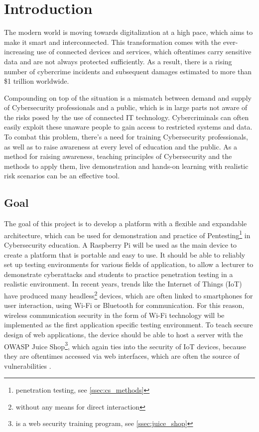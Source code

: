 \chapter{Introduction}\label{ch:intro}
The modern world is moving towards digitalization at a high pace, which aims to make it smart and interconnected. 
This transformation comes with the ever-increasing use of connected devices and services, which oftentimes carry sensitive data and are not always protected sufficiently.
As a result, there is a rising number of cybercrime incidents and subsequent damages estimated to more than \$1 trillion worldwide.

Compounding on top of the situation is a mismatch between demand and supply of Cybersecurity professionals and a public, which is in large parts not aware of the risks posed by the use of connected IT technology.
Cybercriminals can often easily exploit these unaware people to gain access to restricted systems and data.
To combat this problem, there's a need for training Cybersecurity professionals, as well as to raise awareness at every level of education and the public.
As a method for raising awareness, teaching principles of Cybersecurity and the methods to apply them, live demonstration and hands-on learning with realistic risk scenarios can be an effective tool. \cite{mariano2024wifi}\cite{Cybersec_Edu}


\section{Goal}
The goal of this project is to develop a platform with a flexible and expandable architecture, which can be used for demonstration and practice of Pentesting\footnote{penetration testing, see \cref{ssec:cs_methods}} in Cybersecurity education.
A Raspberry Pi will be used as the main device to create a platform that is portable and easy to use.
It should be able to reliably set up testing environments for various fields of application, to allow a lecturer to demonstrate cyberattacks and students to practice penetration testing in a realistic environment.
In recent years, trends like the Internet of Things (IoT) have produced many headless\footnote{without any means for direct interaction} devices, which are often linked to smartphones for user interaction, using Wi-Fi or Bluetooth for communication.
For this reason, wireless communication security in the form of Wi-Fi technology will be implemented as the first application specific testing environment.
To teach secure design of web applications, the device should be able to host a server with the OWASP Juice Shop\footnote{is a web security training program, see \cref{ssec:juice_shop}}, which again ties into the security of IoT devices, because they are oftentimes accessed via web interfaces, which are often the source of vulnerabilities \cite[page~174]{Hellmann_2023}.

